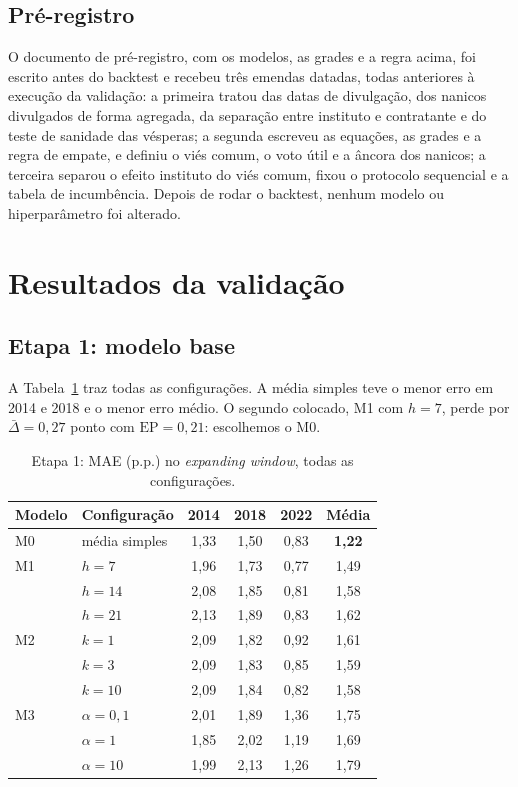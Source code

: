 \documentclass[10.5pt,a4paper]{article}
\begin{document}
\subsection{Pré-registro}
O documento de pré-registro, com os modelos, as grades e a regra acima, foi escrito antes do backtest e recebeu três emendas datadas, todas anteriores à execução da validação: a primeira tratou das datas de divulgação, dos nanicos divulgados de forma agregada, da separação entre instituto e contratante e do teste de sanidade das vésperas; a segunda escreveu as equações, as grades e a regra de empate, e definiu o viés comum, o voto útil e a âncora dos nanicos; a terceira separou o efeito instituto do viés comum, fixou o protocolo sequencial e a tabela de incumbência. Depois de rodar o backtest, nenhum modelo ou hiperparâmetro foi alterado.

\section{Resultados da validação}

\subsection{Etapa 1: modelo base}
A Tabela~\ref{tab:etapa1} traz todas as configurações. A média simples teve o menor erro em 2014 e 2018 e o menor erro médio. O segundo colocado, M1 com $h=7$, perde por $\bar\Delta=0{,}27$ ponto com $\text{EP}=0{,}21$: escolhemos o M0.

\begin{table}[h]
\centering\small
\caption{Etapa 1: MAE (p.p.) no \emph{expanding window}, todas as configurações.}
\label{tab:etapa1}
\begin{tabular}{llcccc}
\toprule
Modelo & Configuração & 2014 & 2018 & 2022 & Média \\
\midrule
\rowcolor{azulclaro} M0 & média simples & 1,33 & 1,50 & 0,83 & \textbf{1,22} \\
M1 & $h=7$ & 1,96 & 1,73 & 0,77 & 1,49 \\
   & $h=14$ & 2,08 & 1,85 & 0,81 & 1,58 \\
   & $h=21$ & 2,13 & 1,89 & 0,83 & 1,62 \\
M2 & $k=1$ & 2,09 & 1,82 & 0,92 & 1,61 \\
   & $k=3$ & 2,09 & 1,83 & 0,85 & 1,59 \\
   & $k=10$ & 2,09 & 1,84 & 0,82 & 1,58 \\
M3 & $\alpha=0{,}1$ & 2,01 & 1,89 & 1,36 & 1,75 \\
   & $\alpha=1$ & 1,85 & 2,02 & 1,19 & 1,69 \\
   & $\alpha=10$ & 1,99 & 2,13 & 1,26 & 1,79 \\
\bottomrule
\end{tabular}
\end{table}
\end{document}
